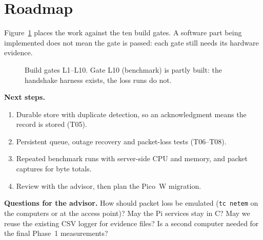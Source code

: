 \documentclass[11pt,a4paper]{article}
\begin{document}
\section{Roadmap}

Figure~\ref{fig:roadmap} places the work against the ten build gates. A software part being
implemented does not mean the gate is passed: each gate still needs its hardware evidence.

\begin{figure}[h]
\centering
{}
\caption{Build gates L1--L10. Gate L10 (benchmark) is partly built: the handshake harness exists,
the loss runs do not.}
\label{fig:roadmap}
\end{figure}

\textbf{Next steps.}
\begin{enumerate}\setlength\itemsep{0pt}
\item Durable store with duplicate detection, so an acknowledgment means the record is stored (T05).
\item Persistent queue, outage recovery and packet-loss tests (T06--T08).
\item Repeated benchmark runs with server-side CPU and memory, and packet captures for byte totals.
\item Review with the advisor, then plan the Pico~W migration.
\end{enumerate}

\textbf{Questions for the advisor.} How should packet loss be emulated (\texttt{tc netem} on the
computers or at the access point)? May the Pi services stay in C? May we reuse the existing CSV
logger for evidence files? Is a second computer needed for the final Phase~1 measurements?
\end{document}
